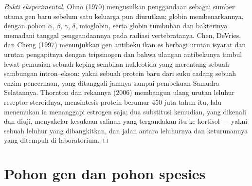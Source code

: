 \begin{proof}[Bukti eksperimental]
Ohno (1970) mengusulkan penggandaan sebagai sumber utama gen baru
sebelum satu keluarga pun diurutkan; globin membenarkannya, dengan
pohon $\alpha$, $\beta$, $\gamma$, $\delta$, mioglobin, serta globin tumbuhan
dan bakterinya memadani tanggal penggandaannya pada radiasi
vertebratanya. Chen, DeVries, dan Cheng (1997) menunjukkan gen antibeku ikan es
berbagi urutan isyarat dan urutan pengapitnya dengan tripsinogen
dan bahwa ulangan antibekunya timbul lewat pemuaian sebuah keping sembilan nukleotida
yang merentang sebuah sambungan intron--ekson: yakni sebuah protein baru dari
suku cadang sebuah enzim pencernaan, yang ditanggali jamnya sampai pembekuan
Samudra Selatannya. Thornton dan rekannya (2006) membangun ulang
urutan leluhur reseptor steroidnya, mensintesis
protein berumur 450 juta tahun itu, lalu menemukan ia menanggapi estrogen
saja; dua substitusi kemudian, yang dikenali dan diuji, menyakelar
kesukaan salinan yang tergandakan itu ke kortisol --- yakni sebuah leluhur yang dibangkitkan,
dan jalan antara leluhurnya dan keturunannya yang ditempuh di laboratorium.
\end{proof}

\section{Pohon gen dan pohon spesies}

